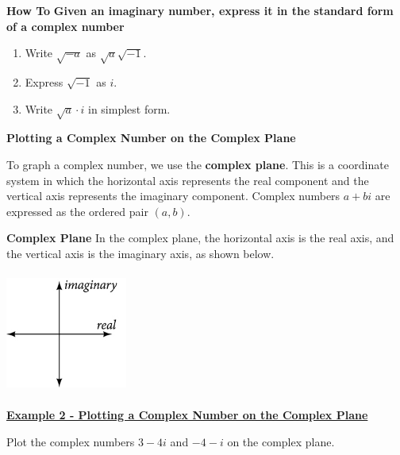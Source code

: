 \documentclass[12pt]{book}
\begin{document}
\begin{boxR}
    \textbf{How To}
      \vspace{1mm}
    \hline
    \vspace{2mm}
    \textbf{Given an imaginary number, express it in the standard form of a complex number}
    \begin{enumerate}
        \item Write $\sqrt{-a}$ as $\sqrt{a}\sqrt{-1}$.
        \item Express $\sqrt{-1}$ as $i$.
        \item Write $\sqrt{a} \cdot i$ in simplest form.
    \end{enumerate}
\end{boxR}
\vspace{3mm}
{\large \textbf{Plotting a Complex Number on the Complex Plane}}
\vspace{3mm}

To graph a complex number, we use the \textbf{complex plane}. This is a coordinate system in which the horizontal axis represents the real component and the vertical axis represents the imaginary component.
Complex numbers $a+bi$ are expressed as the ordered pair $(a,b)$.

\newpage
\begin{boxR}
    \textbf{Complex Plane}
    \vspace{1mm}
    \hline
    \vspace{2mm}
    In the complex plane, the horizontal axis is the real axis, and the vertical axis is the imaginary axis, as shown below.
    
   \centerline{ \includegraphics[height=40mm, width=40mm]{2.4-ComplexPlane.jpeg}}
\end{boxR}

\underline{\textbf{Example 2 - Plotting a Complex Number on the Complex Plane}}

Plot the complex numbers $3-4i$ and $-4-i$ on the complex plane. 
\end{document}
